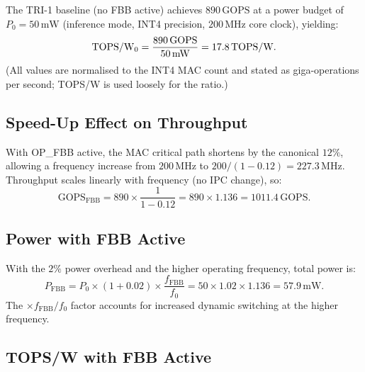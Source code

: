 The TRI-1 baseline (no FBB active) achieves $890\,\mathrm{GOPS}$ at
a power budget of $P_{0} = 50\,\mathrm{mW}$ (inference mode, INT4
precision, $200\,\mathrm{MHz}$ core clock), yielding:
\begin{equation}
  \mathrm{TOPS/W}{}_{0} = \frac{890\,\mathrm{GOPS}}{50\,\mathrm{mW}}
              = 17.8\,\mathrm{TOPS/W}.
  \label{eq:tops-baseline}
\end{equation}
(All values are normalised to the INT4 MAC count and stated as
giga-operations per second; TOPS/W is used loosely for the ratio.)

\subsection{Speed-Up Effect on Throughput}
\label{subsec:speedup-throughput}

With OP\_FBB active, the MAC critical path shortens by the canonical
$12\%$, allowing a frequency increase from $200\,\mathrm{MHz}$ to
$200/(1 - 0.12) = 227.3\,\mathrm{MHz}$.  Throughput scales linearly
with frequency (no IPC change), so:
\begin{equation}
  \mathrm{GOPS}_{\mathrm{FBB}}
    = 890 \times \frac{1}{1 - 0.12}
    = 890 \times 1.136
    = 1011.4\,\mathrm{GOPS}.
  \label{eq:gops-fbb}
\end{equation}

\subsection{Power with FBB Active}
\label{subsec:power-fbb}

With the $2\%$ power overhead and the higher operating frequency,
total power is:
\begin{equation}
  P_{\mathrm{FBB}}
    = P_{0} \times (1 + 0.02) \times \frac{f_{\mathrm{FBB}}}{f_{0}}
    = 50 \times 1.02 \times 1.136
    = 57.9\,\mathrm{mW}.
  \label{eq:power-fbb}
\end{equation}
The $\times f_{\mathrm{FBB}}/f_{0}$ factor accounts for increased
dynamic switching at the higher frequency.

\subsection{TOPS/W with FBB Active}
\label{subsec:tops-fbb}


